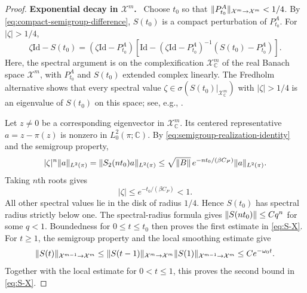 \documentclass[11pt,reqno]{amsart}
\numberwithin{equation}{section}
\theoremstyle{plain}
\theoremstyle{remark}
\DeclarePairedDelimiter{\norm}{\lVert}{\rVert}
\newcommand{\parheading}[1]{\par\medskip\noindent\textbf{#1}\ }
\newcommand{\Xspace}{\mathcal X}
\newcommand{\Id}{\mathrm{Id}}
\begin{document}
\begin{proof}
\parheading{Exponential decay in $\Xspace^m$.}
Choose $t_0$ so that $\norm{P_{t_0}^A}_{\Xspace^m\to\Xspace^m}<1/4$. By \eqref{eq:compact-semigroup-difference}, $S(t_0)$ is a compact perturbation of $P_{t_0}^A$. For $|\zeta|>1/4$,
\begin{equation}\label{eq:Fredholm-factorization}
 \zeta\Id-S(t_0)
 =(\zeta\Id-P_{t_0}^A)
 \left[\Id-(\zeta\Id-P_{t_0}^A)^{-1}(S(t_0)-P_{t_0}^A)\right].
\end{equation}
Here, the spectral argument is on the complexification $\Xspace^m_{\mathbb C}$ of the real Banach space $\Xspace^m$, with $P_{t_0}^A$ and $S(t_0)$ extended complex linearly. The Fredholm alternative shows that every spectral value $\zeta\in\sigma(S(t_0)|_{\Xspace^m_{\mathbb C}})$ with $|\zeta|>1/4$ is an eigenvalue of $S(t_0)$ on this space; see, e.g., \cite[Chapters IV--V]{EngelNagel}.

Let $z\ne0$ be a corresponding eigenvector in $\Xspace^m_{\mathbb C}$. Its centered representative $a=z-\pi(z)$ is nonzero in $L^2_0(\pi;\mathbb C)$. By \eqref{eq:semigroup-realization-identity} and the semigroup property,
\begin{equation}\label{eq:eigenvector-iteration}
 |\zeta|^n\norm a_{L^2(\pi)}
 =\norm{S_2(nt_0)a}_{L^2(\pi)}
 \le\sqrt{\norm B}\,e^{-nt_0/(\beta C_P)}\norm a_{L^2(\pi)}.
\end{equation}
Taking $n$th roots gives
\begin{equation}\label{eq:eigenvalue-bound}
 |\zeta|\le e^{-t_0/(\beta C_P)}<1.
\end{equation}
All other spectral values lie in the disk of radius $1/4$. Hence $S(t_0)$ has spectral radius strictly below one. The spectral-radius formula gives $\norm{S(nt_0)}\le Cq^n$ for some $q<1$. Boundedness for $0\le t\le t_0$ then proves the first estimate in \eqref{eq:S-X}. For $t\ge1$, the semigroup property and the local smoothing estimate give
\begin{equation}\label{eq:longtime-one-derivative-smoothing}
 \norm{S(t)}_{\Xspace^{m-1}\to\Xspace^m}
 \le\norm{S(t-1)}_{\Xspace^m\to\Xspace^m}
      \norm{S(1)}_{\Xspace^{m-1}\to\Xspace^m}
 \le C e^{-\omega_0t}.
\end{equation}
Together with the local estimate for $0<t\le1$, this proves the second bound in \eqref{eq:S-X}.


\end{proof}
\end{document}
